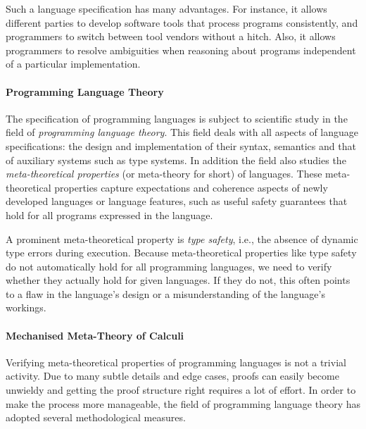 {%

Such a language specification has many advantages. For instance, it allows
different parties to develop software tools that process programs consistently,
and programmers to switch between tool vendors without a hitch.  Also, it allows
programmers to resolve ambiguities when reasoning about programs independent of
a particular implementation.


\paragraph{Programming Language Theory}
The specification of programming languages is subject to scientific study in the
field of \emph{programming language theory}. This field deals with all aspects
of language specifications: the design and implementation of their syntax,
semantics and that of auxiliary systems such as type systems. In addition the
field also studies the \emph{meta-theoretical properties} (or meta-theory for
short) of languages. These meta-theoretical properties capture expectations and
coherence aspects of newly developed languages or language features, such as
useful safety guarantees that hold for all programs expressed in the language.

A prominent meta-theoretical property is \emph{type safety}, i.e., the absence
of dynamic type errors during execution. Because meta-theoretical properties
like type safety do not automatically hold for all programming languages, we
need to verify whether they actually hold for given languages. If they do not,
this often points to a flaw in the language's design or a misunderstanding of
the language's workings.

\paragraph{Mechanised Meta-Theory of Calculi}
Verifying meta-theoretical properties of programming languages is not a trivial
activity. Due to many subtle details and edge cases, proofs can easily become
unwieldy and getting the proof structure right requires a lot of effort. In
order to make the process more manageable, the field of programming language
theory has adopted several methodological measures.

}
